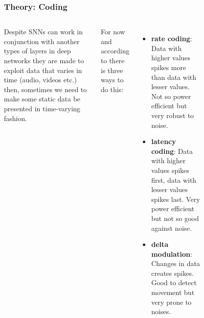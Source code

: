 \begin{frame}[allowframebreaks]
	\frametitle{Theory: Coding}
	\begin{columns}
			\par Despite SNNs can work in conjunction with another types of layers in deep networks they are made to exploit data that varies in time (audio, videos etc.) then, sometimes we need to make some static data be presented in time-varying fashion.\newline
			
			\par For now and according to \cite{10242251} there is three ways to do this:
			\begin{itemize}
				\item \textbf{rate coding}: Data with higher values spikes more than data with lesser values. Not so power efficient but very robust to noise.
				\item \textbf{latency coding}: Data with higher values spikes first, data with lesser values spikes last. Very power efficient but not so good against noise.
				\item \textbf{delta modulation}: Changes in data creates spikes. Good to detect movement but very prone to noises.
			\end{itemize}
			\begin{figure}
				\centering

\end{figure}
\end{columns}
\end{frame}
